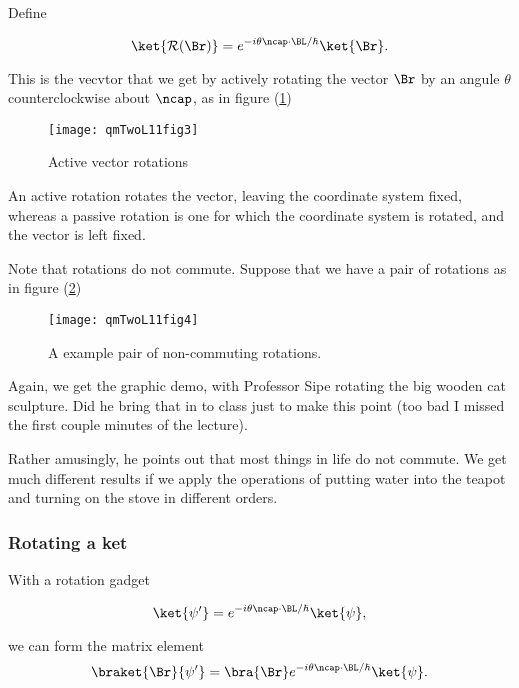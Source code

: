 Define 

\begin{equation}\label{eqn:qmTwoL11:350}
\ket{\mathcal{R}(\Br)} = 
e^{-i \theta \ncap \cdot \BL/\hbar}
\ket{\Br} .
\end{equation}

This is the vecvtor that we get by actively rotating the vector $\Br$ by an angule $\theta$ counterclockwise about $\ncap$, as in figure (\ref{fig:qmTwoL11:qmTwoL11fig3})

\begin{figure}[htp]
   \centering
   \texttt{[image: qmTwoL11fig3]}
   \caption{Active vector rotations}\label{fig:qmTwoL11:qmTwoL11fig3}
\end{figure}

An active rotation rotates the vector, leaving the coordinate system fixed, whereas a passive rotation is one for which the coordinate system is rotated, and the vector is left fixed.

Note that rotations do not commute.  Suppose that we have a pair of rotations as in figure (\ref{fig:qmTwoL11:qmTwoL11fig4})
\begin{figure}[htp]
   \centering
   \texttt{[image: qmTwoL11fig4]}
   \caption{A example pair of non-commuting rotations.}\label{fig:qmTwoL11:qmTwoL11fig4}
\end{figure}

Again, we get the graphic demo, with Professor Sipe rotating the big wooden cat sculpture.  Did he bring that in to class just to make this point (too bad I missed the first couple minutes of the lecture).

Rather amusingly, he points out that most things in life do not commute.  We get much different results if we apply the operations of putting water into the teapot and turning on the stove in different orders.

\subsubsection{Rotating a ket}

With a rotation gadget

\begin{equation}\label{eqn:qmTwoL11:370}
\ket{\psi'} = 
e^{-i \theta \ncap \cdot \BL/\hbar }
\ket{\psi},
\end{equation}

we can form the matrix element
\begin{equation}\label{eqn:qmTwoL11:390}
\braket{\Br}{\psi'} = 
\bra{\Br} e^{-i \theta \ncap \cdot \BL/\hbar }
\ket{\psi}.
\end{equation}

